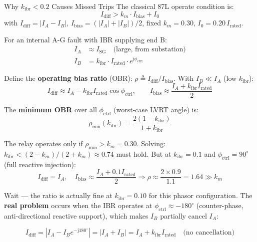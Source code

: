 \documentclass[12pt,a4paper]{article}
\newcommand{\kibr}{k_\mathrm{ibr}}
\newcommand{\Irated}{I_\mathrm{rated}}
\newcommand{\Idiff}{I_\mathrm{diff}}
\newcommand{\Ibias}{I_\mathrm{bias}}
\newcommand{\km}{k_m}
\newcommand{\Izero}{I_0}
\newcommand{\phictrl}{\phi_\mathrm{ctrl}}
\newcommand{\jj}{\mathrm{j}}
\begin{document}
\begin{formulabox}{Why $\kibr < 0.2$ Causes Missed Trips}
The classical 87L operate condition is:
\begin{equation}
  \Idiff > \km \cdot \Ibias + \Izero
  \label{eq:87L_classic}
\end{equation}
with $\Idiff = |I_A - I_B|$, $\Ibias = (|I_A| + |I_B|)/2$, fixed $\km = 0.30$,
$\Izero = 0.20\,\Irated$.

For an internal A-G fault with IBR supplying end B:
\begin{align}
  I_A &\approx I_\mathrm{SG} \quad \text{(large, from substation)} \\
  I_B &= \kibr \cdot \Irated \cdot e^{\jj\phictrl}
\end{align}

Define the \textbf{operating bias ratio} (OBR):
$\rho \triangleq \Idiff / \Ibias$.  With $I_B \ll I_A$ (low $\kibr$):
\begin{equation}
  \Idiff \approx I_A - \kibr\Irated\cos\phictrl, \qquad
  \Ibias \approx \frac{I_A + \kibr\Irated}{2}
\end{equation}

The \textbf{minimum OBR} over all $\phictrl$ (worst-case LVRT angle) is:
\begin{equation}
  \rho_\mathrm{min}(\kibr) = \frac{2(1-\kibr)}{1+\kibr}
  \label{eq:rho_min}
\end{equation}

The relay operates only if $\rho_\mathrm{min} > \km = 0.30$.
Solving: $\kibr < (2-\km)/(2+\km) \approx 0.74$ must hold.
But at $\kibr=0.1$ and $\phictrl=90^\circ$ (full reactive injection):
\begin{equation}
  \Idiff = I_A, \quad \Ibias \approx \frac{I_A + 0.1\Irated}{2}
  \Rightarrow \rho \approx \frac{2 \times 0.9}{1.1} = 1.64 \gg \km
\end{equation}
\end{formulabox}

\noindent Wait --- the ratio is actually fine at $\kibr = 0.10$ for this phasor configuration.
The \textbf{real problem} occurs when the IBR operates at $\phictrl \approx -180^\circ$
(counter-phase, anti-directional reactive support), which makes $I_B$ partially cancel $I_A$:

\begin{equation}
  \Idiff = |I_A - I_B e^{-\jj 180^\circ}| = |I_A + I_B| = I_A + \kibr\Irated
  \quad \text{(no cancellation)}
\end{equation}
\end{document}
